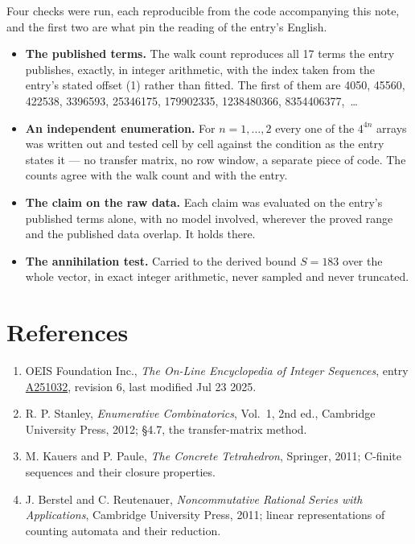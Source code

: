 \documentclass[11pt]{article}
\theoremstyle{definition}
\begin{document}
Four checks were run, each reproducible from the code accompanying this note, and the first two are what pin the reading of the entry's English.

\begin{itemize}

\item {\bfseries The published terms.} The walk count reproduces all 17 terms the entry publishes, exactly, in integer arithmetic, with the index taken from the entry's stated offset (1) rather than fitted. The first of them are 4050, 45560, 422538, 3396593, 25346175, 179902335, 1238480366, 8354406377,~\dots

\item {\bfseries An independent enumeration.} For $n = 1,\dots,2$ every one of the $4^{4n}$ arrays was written out and tested cell by cell against the condition as the entry states it --- no transfer matrix, no row window, a separate piece of code. The counts agree with the walk count and with the entry.

\item {\bfseries The claim on the raw data.} Each claim was evaluated on the entry's published terms alone, with no model involved, wherever the proved range and the published data overlap. It holds there.

\item {\bfseries The annihilation test.} Carried to the derived bound $S = 183$ over the whole vector, in exact integer arithmetic, never sampled and never truncated.

\end{itemize}

\section{References}

\begin{enumerate}

\item OEIS Foundation Inc., \emph{The On-Line Encyclopedia of Integer Sequences}, entry \href{https://oeis.org/A251032}{A251032}, revision 6, last modified Jul 23 2025.

\item R. P. Stanley, \emph{Enumerative Combinatorics}, Vol.~1, 2nd ed., Cambridge University Press, 2012; \S4.7, the transfer-matrix method.

\item M. Kauers and P. Paule, \emph{The Concrete Tetrahedron}, Springer, 2011; C-finite sequences and their closure properties.

\item J. Berstel and C. Reutenauer, \emph{Noncommutative Rational Series with Applications}, Cambridge University Press, 2011; linear representations of counting automata and their reduction.

\end{enumerate}
\end{document}
